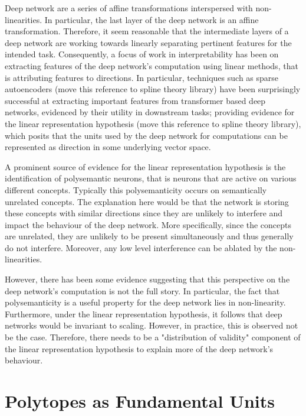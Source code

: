 Deep network are a series of affine transformations interspersed with non-linearities. In particular, the last layer of the deep network is an affine transformation. Therefore, it seem reasonable that the intermediate layers of a deep network are working towards linearly separating pertinent features for the intended task. Consequently, a focus of work in interpretability has been on extracting features of the deep network's computation using linear methods, that is attributing features to directions. %
In particular, techniques such as sparse autoencoders \cite{hubenSparseAutoencodersFind2024} (move this reference to spline theory library) have been surprisingly successful at extracting important features from transformer based deep networks, evidenced by their utility in downstream tasks; providing evidence for the linear representation hypothesis \cite{parkLinearRepresentationHypothesis2024} (move this reference to spline theory library), which posits that the units used by the deep network for computations can be represented as direction in some underlying vector space. 

A prominent source of evidence for the linear representation hypothesis is the identification of polysemantic neurons, that is neurons that are active on various different concepts. Typically this polysemanticity occurs on semantically unrelated concepts. The explanation here would be that the network is storing these concepts with similar directions since they are unlikely to interfere and impact the behaviour of the deep network. More specifically, since the concepts are unrelated, they are unlikely to be present simultaneously and thus generally do not interfere. Moreover, any low level interference can be ablated by the non-linearities.

However, there has been some evidence suggesting that this perspective on the deep network's computation is not the full story. In particular, the fact that polysemanticity is a useful property for the deep network lies in non-linearity. Furthermore, under the linear representation hypothesis, it follows that deep networks would be invariant to scaling. However, in practice, this is observed not be the case. Therefore, there needs to be a "distribution of validity" component of the linear representation hypothesis to explain more of the deep network's behaviour. 

\section{Polytopes as Fundamental Units}\label{sec:polytopes_as_units}

